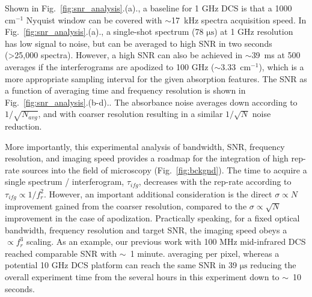 \documentclass{optica-article}
\begin{document}
Shown in \mbox{Fig. \ref{fig:snr_analysis}.(a).}, a baseline for 1 GHz DCS is that a 1000 $\mathrm{cm^{-1}}$ Nyquist window can be covered with \mbox{$\sim$17 kHz} spectra acquisition speed. In \mbox{Fig. \ref{fig:snr_analysis}.(a).}, a single-shot spectrum (78 $\mathrm{\mu s}$) at 1 GHz resolution has low signal to noise, but can be averaged to high SNR in two seconds (>25,000 spectra). However, a high SNR can also be achieved in \mbox{$\sim$39 ms} at 500 averages if the interferograms are apodized to 100 GHz (\mbox{$\sim$3.33 $\mathrm{cm^{-1}}$}), which is a more appropriate sampling interval for the given absorption features. The SNR as a function of averaging time and frequency resolution is shown in \mbox{Fig. \ref{fig:snr_analysis}.(b-d).}. The absorbance noise averages down according to $1/\sqrt{N_{avg}}$, and with coarser resolution resulting in a similar $1/\sqrt{N}$ noise reduction. 

More importantly, this experimental analysis of bandwidth, SNR, frequency resolution, and imaging speed provides a roadmap for the integration of high rep-rate sources into the field of microscopy (\mbox{Fig. \ref{fig:bckgnd}}). The time to acquire a single spectrum / interferogram, $\tau_{ifg}$, decreases with the rep-rate according to $\tau_{ifg} \propto 1 / f_r^2$. However, an important additional consideration is the direct $\sigma \propto N$ improvement gained from the coarser resolution, compared to the $\sigma \propto \sqrt{N}$ improvement in the case of apodization. Practically speaking, for a fixed optical bandwidth, frequency resolution and target SNR, the imaging speed obeys a $\propto f_r^3$ scaling. As an example, our previous work with 100 MHz mid-infrared DCS \cite{lindMidInfraredFrequencyComb2020,timmersMolecularFingerprintingBright2018} reached comparable SNR with \mbox{$\sim$ 1} minute. averaging per pixel, whereas a potential 10 GHz DCS platform can reach the same SNR in 39 $\mathrm{\mu s}$ reducing the overall experiment time from the several hours in this experiment down to \mbox{$\sim$ 10} seconds.

\end{document}
